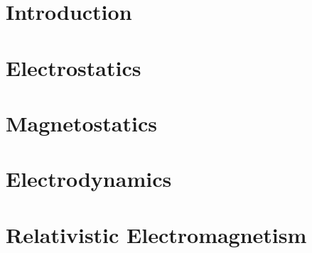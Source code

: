 \documentclass[british,11pt,a4paper]{report}
\begin{document}
\maketitle
\tableofcontents

\chapter{Introduction}

\chapter{Electrostatics}

\chapter{Magnetostatics}

\chapter{Electrodynamics}

\chapter{Relativistic Electromagnetism}

\end{document}
